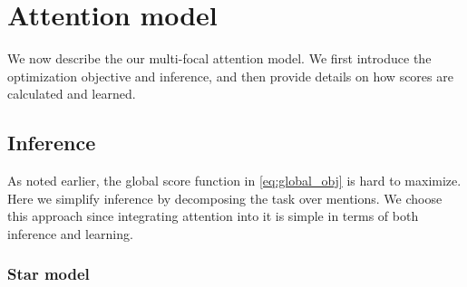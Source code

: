 \section{Attention model}
\label{sec:attention}

We now describe the our multi-focal attention model. We first introduce the optimization objective and inference, and then provide details on how scores are calculated and learned.

\subsection{Inference}
As noted earlier, the global score function in \eqref{eq:global_obj} is hard to maximize.
Here we simplify inference by decomposing the task over mentions. 
We choose this approach since integrating attention into it is simple in terms of both inference and learning.




\subsubsection{Star model}

